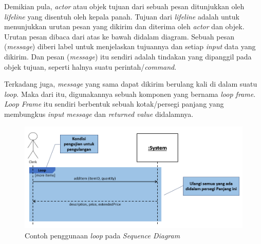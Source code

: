 \documentclass[a4paper]{article}
\begin{document}
\begin{enumerate}
    Demikian pula, \textit{actor} atau objek tujuan dari sebuah pesan ditunjukkan oleh \textit{lifeline} yang disentuh oleh kepala panah. Tujuan dari \textit{lifeline} adalah untuk menunjukkan urutan pesan yang dikirim dan diterima oleh \textit{actor} dan objek. Urutan pesan dibaca dari atas ke bawah didalam diagram. Sebuah pesan (\textit{message}) diberi label untuk menjelaskan tujuannya dan setiap \textit{input} data yang dikirim. Dan pesan (\textit{message}) itu sendiri adalah tindakan yang dipanggil pada objek tujuan, seperti halnya suatu perintah/\textit{command}\autocite[139-146]{uml-satzinger}.

    Terkadang juga, \textit{message} yang sama dapat dikirim berulang kali di dalam suatu \textit{loop}. Maka dari itu, digunakannya sebuah komponen yang bernama \textit{loop frame}. \textit{Loop Frame} itu sendiri berbentuk sebuah kotak/persegi panjang yang membungkus \textit{input message} dan \textit{returned value} didalamnya\autocite[139-146]{uml-satzinger}.

    \begin{figure}[h]
        \centering
        \includegraphics[scale=0.5]{images/uml satzinger/sequence diagram/sequence diagram dgn loop.png}
        \caption{Contoh penggunaan \textit{loop} pada \textit{Sequence Diagram}}
    \end{figure}


\end{enumerate}
\end{document}
